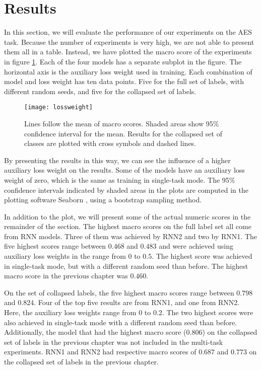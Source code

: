 \section{Results}

In this section, we will evaluate the performance of our experiments on the
\ac{AES} task. Because the number of experiments is very high, we are not
able to present them all in a table. Instead, we have plotted the macro \FI
score of the experiments in figure \ref{fig:lossweight}. Each of the four
models has a separate subplot in the figure. The horizontal axis is the
auxiliary loss weight used in training. Each combination of model and loss
weight has ten data points. Five for the full set of labels, with different
random seeds, and five for the collapsed set of labels.

\begin{figure}
  \centering
  \texttt{[image: lossweight]}
  \caption[Performance of multi-task models]{
    Lines follow the mean of macro \FI scores. Shaded areas show 95\%
    confidence interval for the mean. Results for the collapsed set of
    classes are plotted with cross symbols and dashed lines.
  }
  \label{fig:lossweight}
\end{figure}

By presenting the results in this way, we can see the influence of a higher
auxiliary loss weight on the results. Some of the models have an auxiliary
loss weight of zero, which is the same as training in single-task mode. The
95\% confidence intervals indicated by shaded areas in the plots are computed
in the plotting software Seaborn \autocite{seaborn}, using a bootstrap
sampling method.

In addition to the plot, we will present some of the actual numeric scores in
the remainder of the section. The highest macro \FI scores on the full label
set all come from RNN models. Three of them was achieved by RNN2 and two by
RNN1. The five highest scores range between $0.468$ and $0.483$ and were
achieved using auxiliary loss weights in the range from $0$ to $0.5$. The
highest score was achieved in single-task mode, but with a different random
seed than before. The highest macro \FI score in the previous chapter was
$0.460$.

On the set of collapsed labels, the five highest macro \FI scores range
between $0.798$ and $0.824$. Four of the top five results are from RNN1, and
one from RNN2. Here, the auxiliary loss weights range from $0$ to $0.2$. The
two highest scores were also achieved in single-task mode with a different
random seed than before. Additionally, the model that had the highest macro
\FI score ($0.806$) on the collapsed set of labels in the previous chapter
was not included in the multi-task experiments. RNN1 and RNN2 had respective
macro \FI scores of $0.687$ and $0.773$ on the collapsed set of labels in the
previous chapter.


